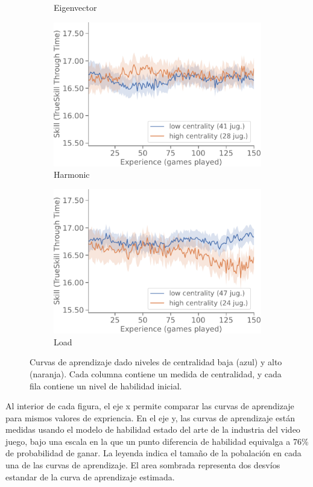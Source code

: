 \documentclass[a4paper,11pt]{book}
\theoremstyle{definition}
\begin{document}
\begin{figure}[ht!]
\begin{subfigure}[t]{0.32\textwidth}
	\caption{Eigenvector}
	\end{subfigure}
	\begin{subfigure}[t]{0.32\textwidth}\centering
	\includegraphics[width=\linewidth]{static/paper/evolucion-ttt-inicial-high-harmonic-centrality-inverse-weight}
	\caption{Harmonic}
	\end{subfigure}
	\begin{subfigure}[t]{0.32\textwidth}\centering
	\includegraphics[width=\linewidth]{static/paper/evolucion-ttt-inicial-high-load-centrality}
	\caption{Load}
	\end{subfigure}
	\caption{
	Curvas de aprendizaje dado niveles de centralidad baja (azul) y alto (naranja). Cada columna contiene un medida de centralidad, y cada fila contiene un nivel de habilidad inicial.
	}
	\label{fig:curvas_de_aprendizaje}
\end{figure}
%
Al interior de cada figura, el eje x permite comparar las curvas de aprendizaje para mismos valores de expriencia.
%
En el eje y, las curvas de aprendizaje están medidas usando el modelo de habilidad estado del arte de la industria del video juego, bajo una escala en la que un punto diferencia de habilidad equivalga a 76\% de probabilidad de ganar.
%
La leyenda indica el tamaño de la pobalación en cada una de las curvas de aprendizaje.
%
El area sombrada representa dos desvíos estandar de la curva de aprendizaje estimada.
\end{document}
